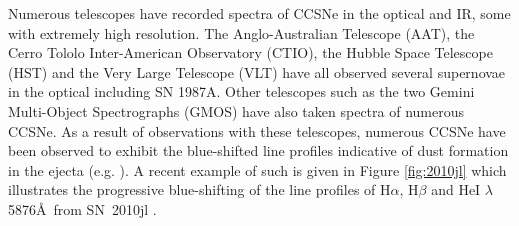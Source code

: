 Numerous telescopes have recorded spectra of CCSNe in the optical and IR, some with extremely high resolution.  The Anglo-Australian Telescope (AAT), the Cerro Tololo Inter-American Observatory (CTIO), the Hubble Space Telescope (HST) and the Very Large Telescope (VLT) have all observed several supernovae in the optical including SN 1987A.  Other telescopes such as the two Gemini Multi-Object Spectrographs (GMOS) have also taken spectra of numerous CCSNe.  As a result of observations with these telescopes, numerous CCSNe have been observed to exhibit the blue-shifted line profiles indicative of dust formation in the ejecta (e.g. \citet{Lucy1989,Fabbri2011,Mauerhan2012,Milisavljevic2012}).  A recent example of such is given in Figure \ref{fig:2010jl} which illustrates the progressive blue-shifting of the line profiles of H$\alpha$, H$\beta$ and  HeI $\lambda$5876\AA\ from SN~2010jl \citep{Gall2014}.

